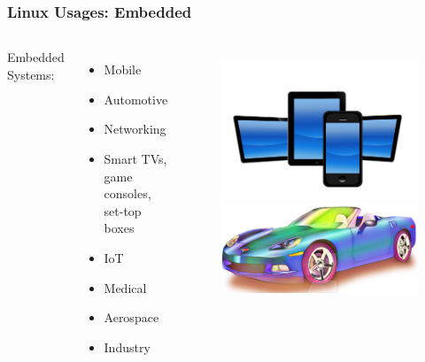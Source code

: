 \begin{frame}
  \frametitle{Linux Usages: Embedded}
  \begin{columns}
    Embedded Systems:
     \begin{itemize}
       \item Mobile
       \item Automotive
       \item Networking
       \item Smart TVs, game consoles, set-top boxes
       \item IoT
       \item Medical
       \item Aerospace
       \item Industry
     \end{itemize}
    \begin{figure}
      \includegraphics[scale=0.04]{images/mobile.jpg}
      \includegraphics[scale=0.4]{images/car.png}

\end{figure}
\end{columns}
\end{frame}
